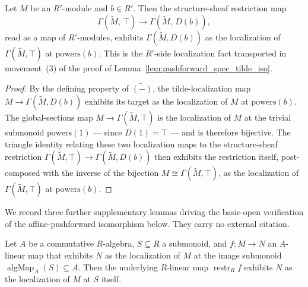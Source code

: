 \begin{lemma}


  \label{lem:tildeRestriction_isLocalizedModule}
  Let \(M\) be an \(R'\)-module and \(b \in R'\). Then the structure-sheaf
  restriction map
  \[
    \Gamma(\widetilde M,\, \top) \longrightarrow \Gamma(\widetilde M,\, D(b)),
  \]
  read as a map of \(R'\)-modules, exhibits \(\Gamma(\widetilde M, D(b))\) as the
  localization of \(\Gamma(\widetilde M, \top)\) at \(\mathrm{powers}(b)\). This is
  the \(R'\)-side localization fact transported in movement~(3) of the proof of
  Lemma~\ref{lem:pushforward_spec_tilde_iso}.
\end{lemma}

\begin{proof}


  By the defining property of \(\widetilde{(-)}\), the tilde-localization map
  \(M \to \Gamma(\widetilde M, D(b))\) exhibits its target as the localization of
  \(M\) at \(\mathrm{powers}(b)\). The global-sections map
  \(M \to \Gamma(\widetilde M, \top)\) is the localization of \(M\) at the trivial
  submonoid \(\mathrm{powers}(1)\) — since \(D(1) = \top\) — and is therefore
  bijective. The triangle identity relating these two localization maps to the
  structure-sheaf restriction \(\Gamma(\widetilde M, \top) \to
  \Gamma(\widetilde M, D(b))\) then exhibits the restriction itself, post-composed
  with the inverse of the bijection \(M \cong \Gamma(\widetilde M, \top)\), as the
  localization of \(\Gamma(\widetilde M, \top)\) at \(\mathrm{powers}(b)\).
\end{proof}

We record three further supplementary lemmas driving the basic-open verification
of the affine-pushforward isomorphism below. They carry no external citation.

\begin{lemma}


  \label{lem:powers_restrictScalars}
  Let \(A\) be a commutative \(R\)-algebra, \(S \subseteq R\) a submonoid, and
  \(f : M \to N\) an \(A\)-linear map that exhibits \(N\) as the localization of
  \(M\) at the image submonoid
  \(\operatorname{algMap}_A(S) \subseteq A\). Then the underlying \(R\)-linear map
  \(\operatorname{restr}_R f\) exhibits \(N\) as the localization of \(M\) at \(S\)
  itself.
\end{lemma}

